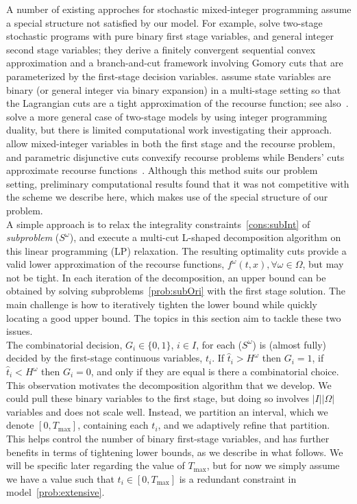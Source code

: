 \documentclass[11pt]{article}
\begin{document}
	A number of existing approches for stochastic mixed-integer programming assume a special structure not satisfied by our model. For example, \citet{gade2014decomposition} solve two-stage stochastic programs with pure binary first stage variables, and general integer second stage variables; they derive a finitely convergent sequential convex approximation and a branch-and-cut framework involving Gomory cuts that are parameterized by the first-stage decision variables. \citet{zou2016nested} assume state variables are binary (or general integer via binary expansion) in a multi-stage setting so that the Lagrangian cuts are a tight approximation of the recourse function; see also~\citet{philpott2016midas}. \citet{caroe1998shaped} solve a more general case of two-stage models by using integer programming duality, but there is limited computational work investigating their approach. \citet{qi2017ancestral} allow mixed-integer variables in both the first stage and the recourse problem, and parametric disjunctive cuts convexify recourse problems while Benders' cuts approximate recourse functions~\citep{chen2012computational}. Although this method suits our problem setting, preliminary computational results found that it was not competitive with the scheme we describe here, which makes use of the special structure of our problem. \\
	\newline
	A simple approach is to relax the integrality constraints~\eqref{cons:subInt} of {\em subproblem} ($S^\omega$), and execute a multi-cut L-shaped decomposition algorithm on this linear programming (LP) relaxation. The resulting optimality cuts provide a valid lower approximation of the recourse functions, \(f^\omega(t,x), \forall \omega \in \Omega\), but may not be tight. In each iteration of the decomposition, an upper bound can be obtained by solving subproblems~\eqref{prob:subOri} with the first stage solution. The main challenge is how to iteratively tighten the lower bound while quickly locating a good upper bound. The topics in this section aim to tackle these two issues. \\
	\newline
	The combinatorial decision, $G_i \in \{0,1\}$,  $i \in I$, for each ($S^\omega$) is (almost fully) decided by the first-stage continuous variables, $t_i$. If $\hat{t}_i > H^\omega$ then $G_i=1$, if $\hat{t}_i < H^\omega$ then $G_i=0$, and only if they are equal is there a combinatorial choice. This observation motivates the decomposition algorithm that we develop. We could pull these binary variables to the first stage, but doing so involves $|I| | \Omega |$ variables and does not scale well. Instead, we partition an interval, which we denote $[0,T_{\max}]$, containing each $t_i$, and we adaptively refine that partition. This helps control the number of binary first-stage variables, and has further benefits in terms of tightening lower bounds, as we describe in what follows. We will be specific later regarding the value of $T_{\max}$, but for now we simply assume we have a value such that $t_i \in [0,T_{\max}]$ is a redundant constraint in model~\eqref{prob:extensive}.  \\
\end{document}
